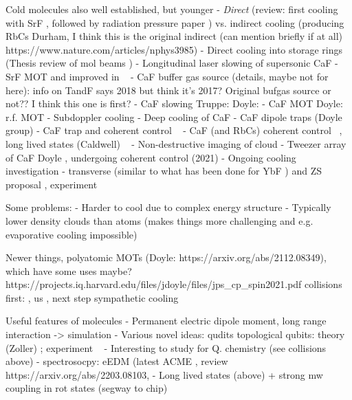 Cold molecules also well established, but younger
- \emph{Direct} (review: \cite{Tarbutt2018} first cooling with SrF \cite{Shuman2009}, followed by
radiation pressure paper \cite{PhysRevLett.108.103002}) vs. indirect cooling
(producing RbCs Durham, I think this is the original indirect (can mention briefly if at all) \cite{PhysRevA.89.033604}
https://www.nature.com/articles/nphys3985)
- Direct cooling into storage rings (Thesis \cite{Crompvoets2005} review of mol beams \cite{vandeMeerakker2012})
- Longitudinal laser slowing of supersonic CaF \cite{PhysRevA.89.053416}
- SrF MOT \cite{Barry2014} and improved in ~\cite{PhysRevLett.116.063004}
- CaF buffer gas source (details, maybe not for here): \cite{Truppe2018} %
info on TandF says 2018 but think it's 2017? Original bufgas source
\cite{Barry2011} or not?? I think this one is first? \cite{Maxwell2005}
- CaF slowing Truppe: \cite{Truppe2017a} Doyle: \cite{0953-4075-49-17-174001}
- CaF MOT Doyle: r.f. MOT \cite{PhysRevLett.119.103201}
- Subdoppler cooling \cite{Truppe2017}
- Deep cooling of CaF \cite{PhysRevLett.123.033202}
- CaF dipole traps (Doyle group)
- CaF trap and coherent control ~\cite{WilliamsMagnetic2018}
- CaF (and RbCs) coherent control ~\cite{Blackmore_2018}, long lived states
(Caldwell) ~\cite{PhysRevLett.124.063001}
- Non-destructive imaging of cloud \cite{PhysRevLett.121.083201}
- Tweezer array of CaF Doyle \cite{Anderegg2019}, undergoing coherent control
\cite{PhysRevLett.127.123202} (2021)
- Ongoing cooling investigation - transverse (similar to what has been done for
YbF \cite{Alauze2021}) and ZS proposal \cite{Fitch2016}, experiment \cite{PhysRevLett.127.263002}

Some problems:
- Harder to cool due to complex energy structure
- Typically lower density clouds than atoms (makes things more challenging and
e.g. evaporative cooling impossible)

Newer things, polyatomic MOTs (Doyle: https://arxiv.org/abs/2112.08349),
which have some uses maybe? https://projects.iq.harvard.edu/files/jdoyle/files/jps_cp_spin2021.pdf
collisions first: \cite{son2019collisional}, us \cite{Jurgilas2021, JurgilasPRL_2021}, next step sympathetic cooling

Useful features of molecules
- Permanent electric dipole moment, long range interaction -> simulation
- Various novel ideas:
   qudits \cite{Sawant_2020}
   topological qubits: theory (Zoller) \cite{Micheli2006};  experiment ~\cite{Gross995}
- Interesting to study for Q. chemistry (see collisions above)
- spectrosocpy: eEDM
(latest ACME \cite{Andreev2018},
review https://arxiv.org/abs/2203.08103, 
- Long lived states (above) + strong mw coupling in rot states (segway to chip)


